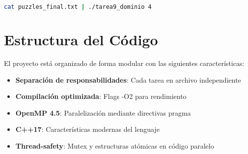 \documentclass[12pt,a4paper]{article}
\begin{document}
\begin{lstlisting}[language=bash, caption=Descomposición de dominio con 4 hilos]
cat puzzles_final.txt | ./tarea9_dominio 4
\end{lstlisting}

\section{Estructura del Código}

El proyecto está organizado de forma modular con las siguientes características:

\begin{itemize}
    \item \textbf{Separación de responsabilidades}: Cada tarea en archivo independiente
    \item \textbf{Compilación optimizada}: Flags -O2 para rendimiento
    \item \textbf{OpenMP 4.5}: Paralelización mediante directivas pragma
    \item \textbf{C++17}: Características modernas del lenguaje
    \item \textbf{Thread-safety}: Mutex y estructuras atómicas en código paralelo
\end{itemize}
\end{document}
